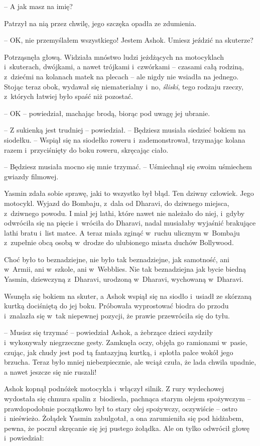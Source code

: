 \documentclass[oneside,polish,11pt,rmheadings]{mwbk}
\begin{document}
-- A jak masz na imię?

Patrzył na nią przez chwilę, jego szczęka opadła ze zdumienia. 

-- OK, nie przemyślałem wszystkiego! Jestem Ashok. Umiesz jeździć na skuterze?

Potrząsnęła głową. Widziała mnóstwo ludzi jeżdżących na motocyklach i~skuterach, dwójkami, a nawet trójkami i~czwórkami -- czasami całą rodziną, z~dziećmi na kolanach matek na plecach -- ale nigdy nie wsiadła na jednego. Stojąc teraz obok, wydawał się niematerialny i~no, \textit{śliski}, tego rodzaju rzeczy, z~których łatwiej było spaść niż pozostać.

-- OK -- powiedział, machając brodą, biorąc pod uwagę jej ubranie.

-- Z sukienką jest trudniej -- powiedział. -- Będziesz musiała siedzieć bokiem na siodełku. -- Wspiął się na siodełko roweru i~zademonstrował, trzymając kolana razem i~przyciśnięty do boku roweru, skręcając ciało. 

-- Będziesz musiała mocno się mnie trzymać. -- Uśmiechnął się swoim uśmiechem gwiazdy filmowej.

Yasmin zdała sobie sprawę, jaki to wszystko był błąd. Ten dziwny człowiek. Jego motocykl. Wyjazd do Bombaju, z~dala od Dharavi, do dziwnego miejsca, z~dziwnego powodu. I miał jej lathi, które nawet nie należało do niej, i~gdyby odwróciła się na pięcie i~wróciła do Dharavi, nadal musiałaby wyjaśnić brakujące lathi bratu i~list matce. A teraz miała zginąć w~ruchu ulicznym w~Bombaju z~zupełnie obcą osobą w~drodze do ulubionego miasta duchów Bollywood.

Choć było to beznadziejne, nie było tak beznadziejne, jak samotność, ani w~Armii, ani w~szkole, ani w~Webblies. Nie tak beznadziejna jak bycie biedną Yasmin, dziewczyną z~Dharavi, urodzoną w~Dharavi, wychowaną w~Dharavi.

Wsunęła się bokiem na skuter, a Ashok wspiął się na siodło i~usiadł ze skórzaną kurtką dociśniętą do jej boku. Próbowała wyprostować biodra do przodu i~znalazła się w~tak niepewnej pozycji, że prawie przewróciła się do tyłu.

-- Musisz się trzymać -- powiedział Ashok, a żebrzące dzieci szydziły i~wykonywały niegrzeczne gesty. Zamknęła oczy, objęła go ramionami w~pasie, czując, jak chudy jest pod tą fantazyjną kurtką, i~splotła palce wokół jego brzucha. Teraz było mniej niebezpiecznie, ale wciąż czuła, że lada chwila upadnie, a nawet jeszcze się nie ruszali!

Ashok kopnął podnóżek motocykla i~włączył silnik. Z rury wydechowej wydostała się chmura spalin z~biodiesla, pachnąca starym olejem spożywczym -- prawdopodobnie początkowo był to stary olej spożywczy, oczywiście -- ostro i~nieświeżo. Żołądek Yasmin zabulgotał, a ona zarumieniła się pod hidżabem, pewna, że poczuł skręcanie się jej pustego żołądka. Ale on tylko odwrócił głowę i~powiedział: 
\end{document}
